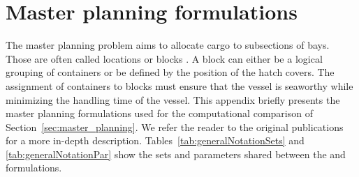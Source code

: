 \documentclass[preprint,12pt,authoryear]{elsarticle}
\begin{document}
\section{Master planning formulations}

The master planning problem aims to allocate cargo to subsections of bays. Those are often called locations \citep{Pacino2011FastVessels} or blocks \citep{Chou2021ApplyingStudy}. A block can either be a logical grouping of containers or be defined by the position of the hatch covers. The assignment of containers to blocks must ensure that the vessel is seaworthy while minimizing the handling time of the vessel. This appendix briefly presents the master planning formulations used for the computational comparison of Section~\ref{sec:master_planning}. We refer the reader to the original publications for a more in-depth description. Tables~\ref{tab:generalNotationSets} and \ref{tab:generalNotationPar} show the sets and parameters shared between the \cite{Pacino2011FastVessels} and \cite{Chou2021ApplyingStudy} formulations.
\end{document}
